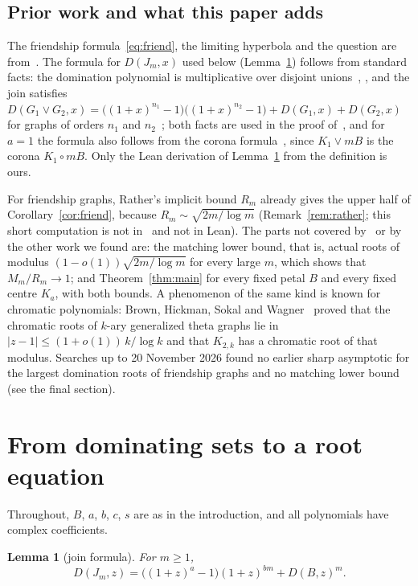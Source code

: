 \documentclass[11pt]{article}
\newtheorem{lemma}{Lemma}
\theoremstyle{definition}
\theoremstyle{remark}
\begin{document}
\subsection*{Prior work and what this paper adds}
The friendship formula~\eqref{eq:friend}, the limiting hyperbola and the
question are from~\cite{abj}. The formula for $D(J_m,x)$ used below
(Lemma~\ref{lem:join}) follows from standard facts: the domination polynomial
is multiplicative over disjoint unions~\cite[Theorem~1]{ap},
\cite[Section~1]{kpstt}, and the join satisfies
$D(G_1\vee G_2,x)=\bigl((1+x)^{n_1}-1\bigr)\bigl((1+x)^{n_2}-1\bigr)+D(G_1,x)+D(G_2,x)$
for graphs of orders $n_1$ and $n_2$~\cite[Theorem~2]{ap}; both facts are
used in the proof of~\cite[Theorem~2.1]{abj}, and for $a=1$ the formula also
follows from the corona formula~\cite[Theorem~3.12]{kpstt}, since
$K_1\vee mB$ is the corona $K_1\circ mB$. Only the
Lean derivation of Lemma~\ref{lem:join} from the definition is ours.

For friendship graphs, Rather's implicit bound $R_m$ already gives the upper
half of Corollary~\ref{cor:friend}, because $R_m\sim\sqrt{2m/\log m}$
(Remark~\ref{rem:rather}; this short computation is not in~\cite{ra} and not
in Lean). The parts not covered by~\cite{ra} or by the other work we found are: the
matching lower bound, that is, actual roots
of modulus $(1-o(1))\sqrt{2m/\log m}$ for every large $m$, which shows that
$M_m/R_m\to1$; and Theorem~\ref{thm:main} for every fixed petal $B$ and every
fixed centre $K_a$, with both bounds. A phenomenon of the same kind is known
for chromatic polynomials: Brown, Hickman, Sokal and Wagner~\cite{bhsw}
proved that the chromatic roots of $k$-ary generalized theta graphs lie in
$|z-1|\le(1+o(1))\,k/\log k$ and that $K_{2,k}$ has a chromatic root of that
modulus. Searches up to 20 November 2026 found no earlier sharp asymptotic
for the largest domination roots of friendship graphs and no matching lower
bound (see the final section).

\section{From dominating sets to a root equation}\label{sec:equation}

Throughout, $B$, $a$, $b$, $c$, $s$ are as in the introduction, and all
polynomials have complex coefficients.

\begin{lemma}[join formula]\label{lem:join}
For $m\ge1$,
\[
D(J_m,z)=\bigl((1+z)^a-1\bigr)(1+z)^{bm}+D(B,z)^m .
\]
\end{lemma}
\end{document}
